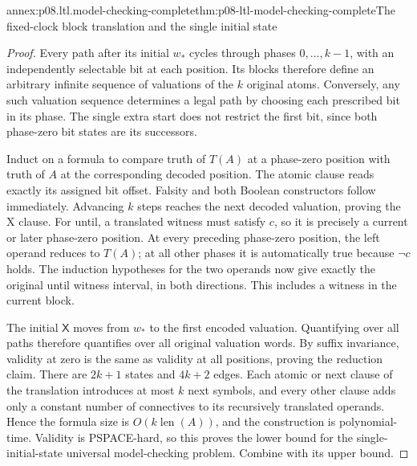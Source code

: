 \begin{annexitem}{annex:p08.ltl.model-checking-complete}{thm:p08-ltl-model-checking-complete}{The fixed-clock block translation and the single initial state}
\begin{proof}
Every path after its initial \(w_*\) cycles through phases
\(0,\ldots,k-1\), with an independently selectable bit at
each position. Its blocks therefore define an arbitrary
infinite sequence of valuations of the \(k\) original atoms.
Conversely, any such valuation sequence determines a legal
path by choosing each prescribed bit in its phase. The
single extra start does not restrict the first bit, since
both phase-zero bit states are its successors.

Induct on a formula to compare truth of \(T(A)\) at a
phase-zero position with truth of \(A\) at the corresponding
decoded position. The atomic clause reads exactly its assigned
bit offset. Falsity and both Boolean constructors follow
immediately. Advancing \(k\) steps reaches the next decoded
valuation, proving the X clause. For until, a translated
witness must satisfy \(c\), so it is precisely a current
or later phase-zero position. At every preceding phase-zero
position, the left operand reduces to \(T(A)\); at all
other phases it is automatically true because \(\neg c\)
holds. The induction hypotheses for the two operands now
give exactly the original until witness interval, in both
directions. This includes a witness in the current block.

The initial \(\mathsf X\) moves from \(w_*\) to the first
encoded valuation. Quantifying over all paths therefore
quantifies over all original valuation words. By suffix
invariance, validity at zero is the same as validity at all
positions, proving the reduction claim. There are \(2k+1\)
states and \(4k+2\) edges. Each atomic or next clause of
the translation introduces at most \(k\) next symbols,
and every other clause adds only a constant number of
connectives to its recursively translated operands. Hence
the formula size is \(O(k\operatorname{len}(A))\), and the construction is
polynomial-time. Validity is PSPACE-hard, so this proves
the lower bound for the single-initial-state universal
model-checking problem. Combine with its upper bound.
\end{proof}
\end{annexitem}

